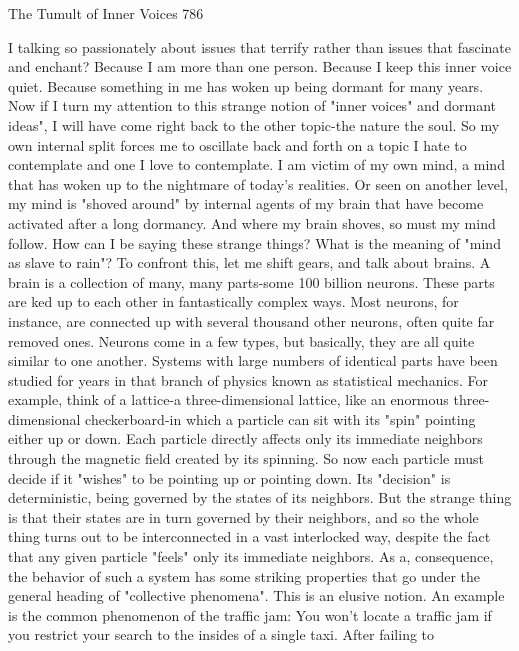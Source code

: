 The Tumult of Inner Voices                                                         786

I talking so passionately about issues that terrify rather than issues that fascinate and
enchant? Because I am more than one person. Because I keep this inner voice quiet.
Because something in me has woken up being dormant for many years.
         Now if I turn my attention to this strange notion of "inner voices" and dormant
ideas", I will have come right back to the other topic-the nature the soul. So my own
internal split forces me to oscillate back and forth on a topic I hate to contemplate and
one I love to contemplate. I am victim of my own mind, a mind that has woken up to
the nightmare of today's realities. Or seen on another level, my mind is "shoved
around" by internal agents of my brain that have become activated after a long
dormancy. And where my brain shoves, so must my mind follow. How can I be
saying these strange things? What is the meaning of "mind as slave to rain"?
         To confront this, let me shift gears, and talk about brains. A brain is a
collection of many, many parts-some 100 billion neurons. These parts are ked up to
each other in fantastically complex ways. Most neurons, for instance, are connected
up with several thousand other neurons, often quite far removed ones. Neurons come
in a few types, but basically, they are all quite similar to one another. Systems with
large numbers of identical parts have been studied for years in that branch of physics
known as statistical mechanics. For example, think of a lattice-a three-dimensional
lattice, like an enormous three-dimensional checkerboard-in which a particle can sit
with its "spin" pointing either up or down. Each particle directly affects only its
immediate neighbors through the magnetic field created by its spinning. So now each
particle must decide if it "wishes" to be pointing up or pointing down. Its "decision" is
deterministic, being governed by the states of its neighbors. But the strange thing is
that their states are in turn governed by their neighbors, and so the whole thing turns
out to be interconnected in a vast interlocked way, despite the fact that any given
particle "feels" only its immediate neighbors.
         As a, consequence, the behavior of such a system has some striking properties
that go under the general heading of "collective phenomena". This is an elusive
notion. An example is the common phenomenon of the traffic jam: You won't locate a
traffic jam if you restrict your search to the insides of a single taxi. After failing to
